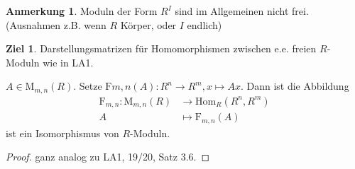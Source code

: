 \documentclass[a4paper, titlepage]{article}
\theoremstyle{definition}
\newtheorem*{anm}{Anmerkung}
\newtheorem*{ziel}{Ziel}
\newcommand{\M}{\mathrm{M}}
\newcommand{\Hom}{\mathrm{Hom}}
\newcommand{\F}{\mathrm{F}}
\begin{document}
        \begin{anm}
            Moduln der Form $R^{I}$ sind im Allgemeinen nicht frei. (Ausnahmen z.B. wenn $R$ Körper, oder $I$ endlich)
        \end{anm}
        \begin{ziel}
            Darstellungsmatrizen für Homomorphismen zwischen e.e. freien $R$-Moduln wie in LA1.
        \end{ziel}
        \begin{satz}
            $A\in\M_{m,n}(R).$ Setze $\F{m,n}(A):R^n\longrightarrow R^m, x\mapsto Ax.$ Dann ist die Abbildung 
            \begin{align*}
                \F_{m,n}:\M_{m,n}(R)&\longrightarrow \Hom_R(R^n,R^m)\\
                A&\longmapsto \F_{m,n}(A)
            \end{align*}
            ist ein Isomorphismus von $R$-Moduln.
        \end{satz}
        \begin{proof}
            ganz analog zu LA1, 19/20, Satz 3.6.
        \end{proof}
\end{document}
